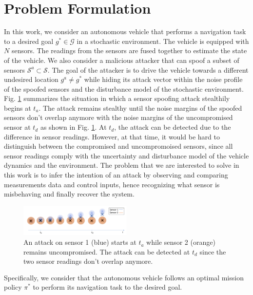 \documentclass[letterpaper, 10 pt, conference]{ieeeconf}  %
\begin{document}
\section{Problem Formulation}\label{sec:problem}
In this work, we consider an autonomous vehicle that performs a navigation task to a desired goal $g^* \in \mathcal G$ in a stochastic environment. The vehicle is equipped with $N$ sensors. The readings from the sensors are fused together to estimate the state of the vehicle. We also consider a malicious attacker that can spoof a subset of sensors $\mathcal{S}^a \subset \mathcal{S}$. The goal of the attacker is to drive the vehicle towards a different undesired location $g^a \neq g^*$ while hiding its attack vector within the noise profile of the spoofed sensors and the disturbance model of the stochastic environment.  Fig. \ref{fig:sensor_spoofing} summarizes the situation in which a sensor spoofing attack stealthily begins at $t_a$. The attack remains stealthy until the noise margins of the spoofed sensors don't overlap anymore with the noise margins of the uncompromised sensor at $t_d$ as shown in Fig. \ref{fig:sensor_spoofing}. At $t_d$, the attack can be detected due to the difference in sensor readings. However, at that time, it would be hard to distinguish between the compromised and uncompromoised sensors, since all sensor readings comply with the uncertainty and disturbance model of the vehicle dynamics and the environment. The problem that we are interested to solve in this work is to infer the intention of an attack by observing and comparing measurements data and control inputs, hence recognizing what sensor is misbehaving and finally recover the system. 
\begin{figure}[h]
\centering
\includegraphics[width=0.5\textwidth]{sensor_spoofing}
\caption{An attack on sensor 1 (blue) starts at $t_a$ while sensor 2 (orange) remains uncompromised. The attack can be detected at $t_d$ since the two sensor readings don't overlap anymore.}
 \label{fig:sensor_spoofing}
\end{figure}
Specifically, we consider that the autonomous vehicle follows an optimal mission policy $\pi^*$ to perform its navigation task to the desired goal. 
\end{document}
